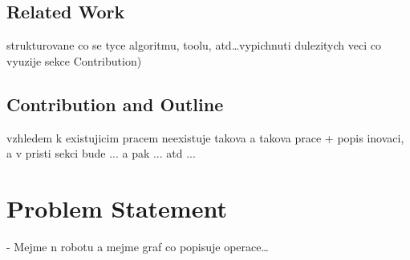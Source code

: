 \subsection{Related Work}

strukturovane co se tyce algoritmu, toolu, atd\ldots vypichnuti dulezitych veci co vyuzije sekce Contribution)

\subsection{Contribution and Outline}

vzhledem k existujicim pracem neexistuje takova a takova prace + popis inovaci, a v pristi sekci bude ... a pak ... atd ...

\section{Problem Statement}
- Mejme n robotu a mejme graf co popisuje operace\ldots 